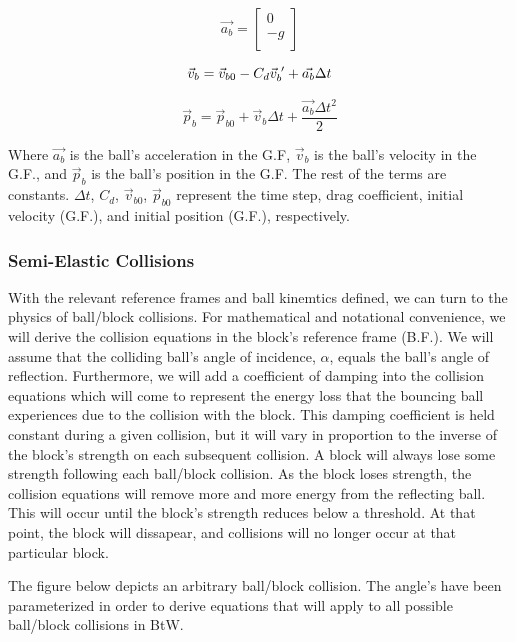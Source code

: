 \documentclass[12pt]{article} %
\begin{document}
\[
\vec{a_{b}} =
  \begin{bmatrix}
    0 \\
    -g \\
  \end{bmatrix}
\]

\[ \vec{v}_{b} = \vec{v}_{b0} -C_{d}\vec{v}_{b}^{\hspace{1mm}\prime}+\vec{a_{b}}\Delta t \]

\[ \vec{p}_{b} = \vec{p}_{b0}  + \vec{v}_{b} \Delta t + \frac{\vec{a_{b}}\Delta t^{2}}{2} \]

Where $\vec{a_{b}}$ is the ball's acceleration in the G.F, $\vec{v}_{b}$ is the ball's velocity in 
the G.F., and $\vec{p}_{b}$ is the ball's position in the G.F. The rest of the terms are constants.
$\Delta t$, $C_{d}$, $\vec{v}_{b0}$, $\vec{p}_{b0}$ represent the time step, drag coefficient, initial
velocity (G.F.), and initial position (G.F.), respectively.



\subsubsection{Semi-Elastic Collisions} %

With the relevant reference frames and ball kinemtics defined, we can turn to 
the physics of ball/block collisions. For mathematical and notational convenience,
we will derive the collision equations in the block's reference frame (B.F.). We will
assume that the colliding ball's angle of incidence, $\alpha$, equals the ball's angle of
reflection. Furthermore, we will add a coefficient of damping into the collision equations
which will come to represent the energy loss that the bouncing ball experiences due to the collision
with the block. This damping coefficient is held constant during a given collision, but it will 
vary in proportion to the inverse of the block's strength on each subsequent collision.
A block will always lose some strength following each ball/block collision. As the block loses strength, the
collision equations will remove more and more energy from the reflecting ball. This will occur until
the block's strength reduces below a threshold. At that point, the block will dissapear, and collisions
will no longer occur at that particular block.

The figure below depicts an arbitrary ball/block collision. The angle's have been parameterized in 
order to derive equations that will apply to all possible ball/block collisions in BtW.
\end{document}
